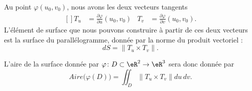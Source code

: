 Au point \( \varphi(u_0,v_0)\), nous avons les deux vecteurs tangents
\begin{equation}
	\begin{aligned}[]
		T_u & =\frac{ \partial \varphi }{ \partial u }(u_0,v_0) & T_v & =\frac{ \partial \varphi }{ \partial v }(u_0,v_0).
	\end{aligned}
\end{equation}
L'élément de surface que nous pouvons construire à partir de ces deux vecteurs est la surface du parallélogramme, donnée par la norme du produit vectoriel :
\begin{equation}        \label{EQooNYWSooZuvcPe}
	dS=\| T_u\times T_v \|.
\end{equation}

L'aire de la surface donnée par \( \varphi\colon D\subset\eR^2\to \eR^3\) sera donc donnée par
\begin{equation}
	Aire\big( \varphi(D) \big)=\iint_D\| T_u\times T_v \|du\,dv.
\end{equation}

